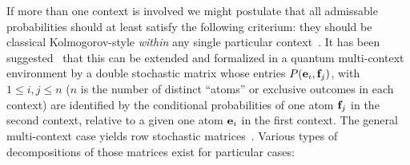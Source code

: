 \documentclass[%
  twocolumn,
 showpacs,
 showkeys,
 preprintnumbers,
 amsmath,amssymb,
 aps,
  pra,
  longbibliography,
 ]{revtex4-1}
\begin{document}
If more than one context is involved we might postulate that all admissable probabilities
should at least satisfy the following criterium: they should be classical Kolmogorov-style
{\em within} any single particular context~\citep{Gleason}.
It has been suggested~\citep{Auffeves-Grangier-2017,Auffeves-Grangier-2018}
that this can be extended and formalized in a quantum multi-context environment by a double stochastic matrix
whose entries $P( {\bf e}_i, {\bf f}_j )$, with $1 \le i,j \le n$ ($n$ is the number of distinct ``atoms'' or exclusive outcomes in each context)   are identified by the conditional probabilities
of one atom ${\bf f}_j$ in the second context,
relative to a given one atom ${\bf e}_i$ in the first context.
The general multi-context case yields row stochastic matrices~\citep{svozil-2019-k}.
Various types of decompositions of those matrices exist for particular cases:
\end{document}
